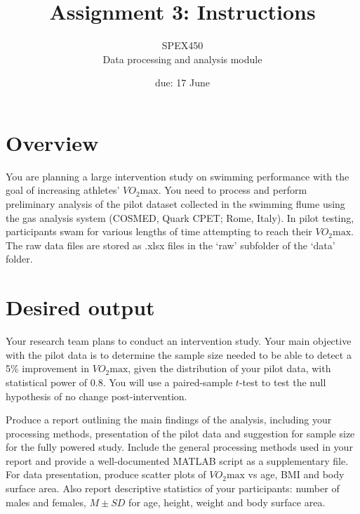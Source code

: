 \documentclass[12pt,a4paper]{article}
\title{Assignment 3: Instructions}
\author{SPEX450\\ Data processing and analysis module}
\date{due: 17 June}
\begin{document}
\maketitle

\section{Overview}
You are planning a large intervention study on swimming performance with the goal of increasing athletes' $VO_{2}\text{max}$.
You need to process and perform preliminary analysis of the pilot dataset collected in the swimming flume using the gas analysis system (COSMED, Quark CPET; Rome, Italy). 
In pilot testing, participants swam for various lengths of time attempting to reach their $VO_{2}\text{max}$.
The raw data files are stored as .xlsx files in the `raw' subfolder of the `data' folder.

\section{Desired output}
Your research team plans to conduct an intervention study.
Your main objective with the pilot data is to determine the sample size needed to be able to detect a 5\% improvement in $VO_{2}\text{max}$, given the distribution of your pilot data, with statistical power of 0.8.
You will use a paired-sample $t$-test to test the null hypothesis of no change post-intervention.

Produce a report outlining the main findings of the analysis, including your processing methods, presentation of the pilot data and suggestion for sample size for the fully powered study.
Include the general processing methods used in your report and provide a well-documented MATLAB script as a supplementary file.
For data presentation, produce scatter plots of $VO_{2}\text{max}$ vs age, BMI and body surface area.
Also report descriptive statistics of your participants: number of males and females, $M\pm SD$ for age, height, weight and body surface area.
\end{document}
